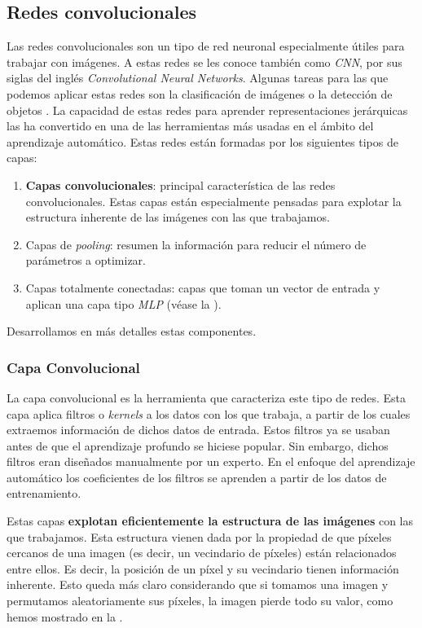 \subsection{Redes convolucionales}

Las redes convolucionales son un tipo de red neuronal especialmente útiles para trabajar con imágenes. A estas redes se les conoce también como \textit{CNN}, por sus siglas del inglés \textit{Convolutional Neural Networks}. Algunas tareas para las que podemos aplicar estas redes son la clasificación de imágenes o la detección de objetos \cite{informatica:paper_definicion_cnn}. La capacidad de estas redes para aprender representaciones jerárquicas las ha convertido en una de las herramientas más usadas en el ámbito del aprendizaje automático. Estas redes están formadas por los siguientes tipos de capas:

\begin{enumerate}
	\item \textbf{Capas convolucionales}: principal característica de las redes convolucionales. Estas capas están especialmente pensadas para explotar la estructura inherente de las imágenes con las que trabajamos.
	\item Capas de \textit{pooling}: resumen la información para reducir el número de parámetros a optimizar.
	\item Capas totalmente conectadas: capas que toman un vector de entrada y aplican una capa tipo \textit{MLP} (véase la ).
\end{enumerate}

Desarrollamos en más detalles estas componentes.

\subsubsection{Capa Convolucional}

La capa convolucional es la herramienta que caracteriza este tipo de redes. Esta capa aplica filtros o \textit{kernels} a los datos con los que trabaja, a partir de los cuales extraemos información de dichos datos de entrada. Estos filtros ya se usaban antes de que el aprendizaje profundo se hiciese popular. Sin embargo, dichos filtros eran diseñados manualmente por un experto. En el enfoque del aprendizaje automático los coeficientes de los filtros se aprenden a partir de los datos de entrenamiento.

Estas capas \textbf{explotan eficientemente la estructura de las imágenes} con las que trabajamos. Esta estructura vienen dada por la propiedad de que píxeles cercanos de una imagen (es decir, un vecindario de píxeles) están relacionados entre ellos. Es decir, la posición de un píxel y su vecindario tienen información inherente. Esto queda más claro considerando que si tomamos una imagen y permutamos aleatoriamente sus píxeles, la imagen pierde todo su valor, como hemos mostrado en la .

